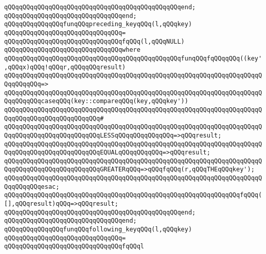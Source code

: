 \verb|qQQqqQQqqQQqqQQqqQQqqQQqqQQqqQQqqQQqqQQqqQQqqQQqend;|\newline
\verb|qQQqqQQqqQQqqQQqqQQqqQQqqQQqqQQqend;|\newline
\newline
\verb|qQQqqQQqqQQqqQQqfunqQQqpreceding_keyqQQq(l,qQQqkey)|\newline
\verb|qQQqqQQqqQQqqQQqqQQqqQQqqQQqqQQq=|\newline
\verb|qQQqqQQqqQQqqQQqqQQqqQQqqQQqqQQqfqQQq(l,qQQqNULL)|\newline
\verb|qQQqqQQqqQQqqQQqqQQqqQQqqQQqqQQqwhere|\newline
\verb|qQQqqQQqqQQqqQQqqQQqqQQqqQQqqQQqqQQqqQQqqQQqqQQqfunqQQqfqQQqqQQq((key',qQQqx)qQQq!qQQqr,qQQqqQQqresult)|\newline
\verb|qQQqqQQqqQQqqQQqqQQqqQQqqQQqqQQqqQQqqQQqqQQqqQQqqQQqqQQqqQQqqQQqqQQqqQQqqQQqqQQq=>|\newline
\verb|qQQqqQQqqQQqqQQqqQQqqQQqqQQqqQQqqQQqqQQqqQQqqQQqqQQqqQQqqQQqqQQqqQQqqQQqqQQqqQQqcaseqQQq(key::compareqQQq(key,qQQqkey'))|\newline
\verb|qQQqqQQqqQQqqQQqqQQqqQQqqQQqqQQqqQQqqQQqqQQqqQQqqQQqqQQqqQQqqQQqqQQqqQQqqQQqqQQqqQQqqQQqqQQqqQQq#|\newline
\verb|qQQqqQQqqQQqqQQqqQQqqQQqqQQqqQQqqQQqqQQqqQQqqQQqqQQqqQQqqQQqqQQqqQQqqQQqqQQqqQQqqQQqqQQqqQQqqQQqLESSqQQqqQQqqQQqqQQq=>qQQqresult;|\newline
\verb|qQQqqQQqqQQqqQQqqQQqqQQqqQQqqQQqqQQqqQQqqQQqqQQqqQQqqQQqqQQqqQQqqQQqqQQqqQQqqQQqqQQqqQQqqQQqqQQqEQUALqQQqqQQqqQQq=>qQQqresult;|\newline
\verb|qQQqqQQqqQQqqQQqqQQqqQQqqQQqqQQqqQQqqQQqqQQqqQQqqQQqqQQqqQQqqQQqqQQqqQQqqQQqqQQqqQQqqQQqqQQqqQQqGREATERqQQq=>qQQqfqQQq(r,qQQqTHEqQQqkey');|\newline
\verb|qQQqqQQqqQQqqQQqqQQqqQQqqQQqqQQqqQQqqQQqqQQqqQQqqQQqqQQqqQQqqQQqqQQqqQQqqQQqqQQqesac;|\newline
\newline
\verb|qQQqqQQqqQQqqQQqqQQqqQQqqQQqqQQqqQQqqQQqqQQqqQQqqQQqqQQqqQQqqQQqfqQQq([],qQQqresult)qQQq=>qQQqresult;|\newline
\verb|qQQqqQQqqQQqqQQqqQQqqQQqqQQqqQQqqQQqqQQqqQQqqQQqend;|\newline
\verb|qQQqqQQqqQQqqQQqqQQqqQQqqQQqqQQqend;|\newline
\verb|qQQqqQQqqQQqqQQqfunqQQqfollowing_keyqQQq(l,qQQqkey)|\newline
\verb|qQQqqQQqqQQqqQQqqQQqqQQqqQQqqQQq=|\newline
\verb|qQQqqQQqqQQqqQQqqQQqqQQqqQQqqQQqfqQQql|\newline
